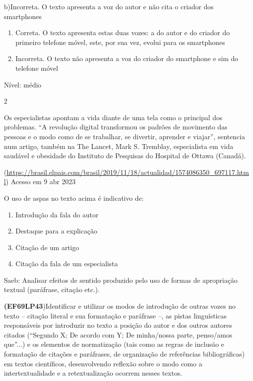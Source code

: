 {b)Incorreta. O texto apresenta a voz do autor e não cita o criador dos
smartphones

\begin{enumerate}
\def\labelenumi{\arabic{enumi}.}
\item
  Correta. O texto apresenta estas duas vozes: a do autor e do criador
  do primeiro telefone móvel, este, por sua vez, evolui para os
  smartphones
\item
  Incorreta. O texto não apresenta a voz do criador do smartphone e sim
  do telefone móvel
\end{enumerate}

Nível: médio

\num{2}

Os especialistas apontam a vida diante de uma tela como o principal dos
problemas. ``A revolução digital transformou os padrões de movimento das
pessoas e o modo como de se trabalhar, se divertir, aprender e viajar'',
sentencia num artigo, também na The Lancet, Mark S. Tremblay,
especialista em vida saudável e obesidade do Instituto de Pesquisas do
Hospital de Ottawa (Canadá).

(\href{https://brasil.elpais.com/brasil/2019/11/18/actualidad/1574086350_697117.html}{\uline{https://brasil.elpais.com/brasil/2019/11/18/actualidad/1574086350\_697117.html}})
Acesso em 9 abr 2023

O uso de aspas no texto acima é indicativo de:

\begin{enumerate}
\def\labelenumi{\alph{enumi})}
\item
  Introdução da fala do autor
\item
  Destaque para a explicação
\item
  Citação de um artigo
\item
  Citação da fala de um especialista
\end{enumerate}

Saeb: Analisar efeitos de sentido produzido pelo uso de formas de
apropriação textual (paráfrase, citação etc.).

\textbf{(EF69LP43})Identificar e utilizar os modos de introdução de
outras vozes no texto -- citação literal e sua formatação e paráfrase
--, as pistas linguísticas responsáveis por introduzir no texto a
posição do autor e dos outros autores citados (``Segundo X; De acordo
com Y; De minha/nossa parte, penso/amos que''...) e os elementos de
normatização (tais como as regras de inclusão e formatação de citações e
paráfrases, de organização de referências bibliográficas) em textos
científicos, desenvolvendo reflexão sobre o modo como a
intertextualidade e a retextualização ocorrem nesses textos.

}
